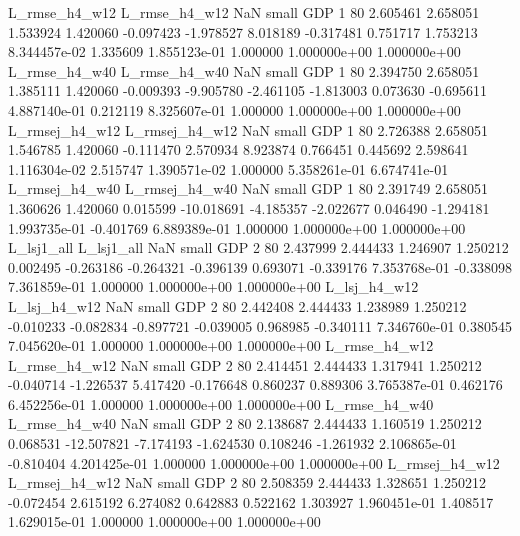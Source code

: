  L_rmse_h4_w12  L_rmse_h4_w12                   NaN      small      GDP                 1 80 2.605461       2.658051 1.533924       1.420060   -0.097423     -1.978527      8.018189    -0.317481       0.751717  1.753213 8.344457e-02     1.335609   1.855123e-01            1.000000    1.000000e+00        1.000000e+00
 L_rmse_h4_w40  L_rmse_h4_w40                   NaN      small      GDP                 1 80 2.394750       2.658051 1.385111       1.420060   -0.009393     -9.905780     -2.461105    -1.813003       0.073630 -0.695611 4.887140e-01     0.212119   8.325607e-01            1.000000    1.000000e+00        1.000000e+00
L_rmsej_h4_w12 L_rmsej_h4_w12                   NaN      small      GDP                 1 80 2.726388       2.658051 1.546785       1.420060   -0.111470      2.570934      8.923874     0.766451       0.445692  2.598641 1.116304e-02     2.515747   1.390571e-02            1.000000    5.358261e-01        6.674741e-01
L_rmsej_h4_w40 L_rmsej_h4_w40                   NaN      small      GDP                 1 80 2.391749       2.658051 1.360626       1.420060    0.015599    -10.018691     -4.185357    -2.022677       0.046490 -1.294181 1.993735e-01    -0.401769   6.889389e-01            1.000000    1.000000e+00        1.000000e+00
    L_lsj1_all     L_lsj1_all                   NaN      small      GDP                 2 80 2.437999       2.444433 1.246907       1.250212    0.002495     -0.263186     -0.264321    -0.396139       0.693071 -0.339176 7.353768e-01    -0.338098   7.361859e-01            1.000000    1.000000e+00        1.000000e+00
  L_lsj_h4_w12   L_lsj_h4_w12                   NaN      small      GDP                 2 80 2.442408       2.444433 1.238989       1.250212   -0.010233     -0.082834     -0.897721    -0.039005       0.968985 -0.340111 7.346760e-01     0.380545   7.045620e-01            1.000000    1.000000e+00        1.000000e+00
 L_rmse_h4_w12  L_rmse_h4_w12                   NaN      small      GDP                 2 80 2.414451       2.444433 1.317941       1.250212   -0.040714     -1.226537      5.417420    -0.176648       0.860237  0.889306 3.765387e-01     0.462176   6.452256e-01            1.000000    1.000000e+00        1.000000e+00
 L_rmse_h4_w40  L_rmse_h4_w40                   NaN      small      GDP                 2 80 2.138687       2.444433 1.160519       1.250212    0.068531    -12.507821     -7.174193    -1.624530       0.108246 -1.261932 2.106865e-01    -0.810404   4.201425e-01            1.000000    1.000000e+00        1.000000e+00
L_rmsej_h4_w12 L_rmsej_h4_w12                   NaN      small      GDP                 2 80 2.508359       2.444433 1.328651       1.250212   -0.072454      2.615192      6.274082     0.642883       0.522162  1.303927 1.960451e-01     1.408517   1.629015e-01            1.000000    1.000000e+00        1.000000e+00
